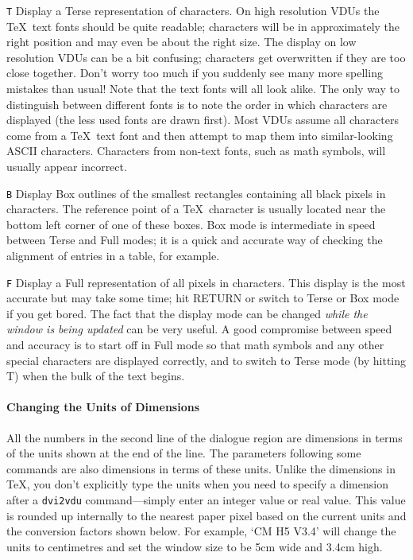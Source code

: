 \begin{list}%
{}%
{\settowidth{\labelwidth}{\tt T}
\settowidth{\labelsep}{aaaa}
\settowidth{\rightmargin}{aaa}
\addtolength{\labelwidth}{\labelsep}
\setlength{\leftmargin}{\labelwidth}}

\item[\tt T]
Display a Terse representation of characters.
On high resolution VDUs the \TeX\ text fonts should be quite readable;
characters will be in
approximately the right position and may even be about the right size.
The display on low resolution VDUs can be a bit confusing; characters get
overwritten if they are too close together.  Don't worry too much
if you suddenly see many more spelling mistakes than usual!
Note that the text fonts will all look alike.
The only way to distinguish between different fonts is to note the
order in which characters are displayed (the less used fonts are drawn first).
Most VDUs assume all characters come from a \TeX\ text font and then attempt
to map them into similar-looking ASCII characters.
Characters from non-text fonts, such as math symbols, will usually appear
incorrect.

\item[\tt B]
Display Box outlines of the smallest rectangles containing all
black pixels in characters.
The reference point of a \TeX\ character is usually located near
the bottom left corner of one of these boxes.
Box mode is intermediate in speed between Terse and Full modes;
it is a quick and accurate way of checking
the alignment of entries in a table, for example.

\item[\tt F]
Display a Full representation of all pixels in characters.
This display is the most accurate but may take some time;
hit RETURN or switch to Terse or Box mode if you get bored.
The fact that the display mode can be changed {\em while the window is
being updated\/} can be very useful.
A good compromise between speed and accuracy is
to start off in Full mode so that math symbols and any other special
characters are displayed correctly, and to switch to Terse mode (by hitting T)
when the bulk of the text begins.
\end{list}

\paragraph{Changing the Units of Dimensions}

All the numbers in the second line of the dialogue region are dimensions in
terms of the units shown at the end of the line.
The parameters following some commands are also dimensions in terms of
these units.
Unlike the dimensions in \TeX, you don't explicitly type the units when you
need to specify a dimension after a {\tt dvi2vdu} command---simply
enter an integer value or real value.
This value is rounded up internally to the nearest paper pixel based on the
current units and the conversion factors shown below.
For example, `CM H5 V3.4' will change the units to centimetres and set the
window size to be 5cm wide and 3.4cm high.

